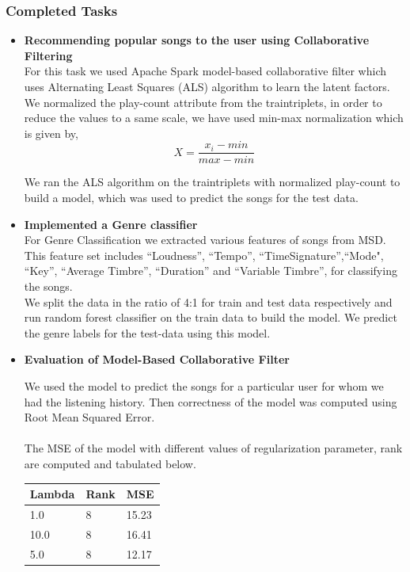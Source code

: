 \documentclass{sig-alternate-05-2015}
\begin{document}
\subsubsection{Completed Tasks}
\begin{itemize}
    \item \textbf{Recommending popular songs to the user using Collaborative Filtering}\\
    For this task we used Apache Spark model-based collaborative filter which uses Alternating Least Squares (ALS) algorithm to learn the latent factors. We normalized the play-count attribute from the traintriplets, in order to reduce the values to a same scale, we have used min-max normalization which is given by,
    \begin{equation*}
        X = \frac{x_i-min}{max-min}
    \end{equation*}
    
    We ran the ALS algorithm on the traintriplets with normalized play-count to build a model, which was used to predict the songs for the test data.
    
    \item \textbf{Implemented a Genre classifier}\\
    For Genre Classification we extracted various features of songs from MSD. This feature set includes ``Loudness'', ``Tempo'', ``TimeSignature'',``Mode", ``Key'', ``Average Timbre'', ``Duration'' and ``Variable Timbre'', for classifying the songs.\\
    
    We split the data in the ratio of 4:1 for train and test data respectively and run random forest classifier on the train data to build the model. We predict the genre labels for the test-data using this model.
    
    
    \item \textbf{Evaluation of Model-Based Collaborative Filter}
    
    We used the model to predict the songs for a particular user for whom we had the listening history. Then correctness of the model was computed using Root Mean Squared Error. \\\\
    The MSE of the model with different values of regularization parameter, rank are computed and tabulated below.
\begin{center}
\begin{tabular} { |p{2cm}|p{2cm}|p{2cm}| } 
\hline \textbf{Lambda} & \textbf{Rank} &\textbf{MSE} \\
\hline 1.0 & 8 & 15.23 \\
\hline 10.0 & 8 & 16.41 \\
\hline 5.0 & 8 & 12.17 \\
\hline
\end{tabular}
\end{center}


\end{itemize}
\end{document}
